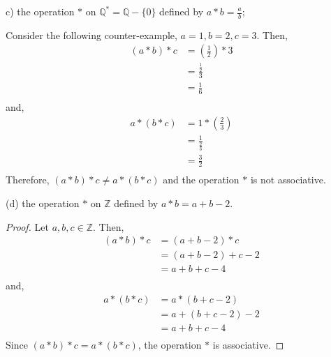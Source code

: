 \documentclass[12pt]{article}
\newenvironment{problem}[2][Problem]{\begin{trivlist}
\item[\hskip \labelsep {\bfseries #1}\hskip \labelsep {\bfseries #2.}]}{\end{trivlist}}
\begin{document}
\begin{problem}{1}
(c) the operation $*$ on $\mathbb{Q}^{*}=\mathbb{Q}-\{0\}$ defined by $a * b=\frac{a}{b}$;

	Consider the following counter-example, $a=1, b=2, c=3$. Then,
	$$
	\begin{aligned}
		(a * b) * c &= (\frac{1}{2}) * 3 \\
			    &= \frac{\frac{1}{2}}{3} \\
			    &= \frac{1}{6} \\
	\end{aligned}
	$$
	and, 
	$$
	\begin{aligned}
		a * (b * c) &= 1 * (\frac{2}{3}) \\
			    &= \frac{1}{\frac{2}{3}} \\
			    &= \frac{3}{2} \\
	\end{aligned}
	$$
	Therefore, $(a * b) * c \neq a * (b * c)$ and the operation $*$ is not associative.
\break

(d) the operation $*$ on $\mathbb{Z}$ defined by $a * b=a+b-2$.
\begin{proof}
	Let $a,b,c \in \mathbb{Z}$. Then,
	$$
	\begin{aligned}
	(a * b) * c &= (a+b-2) * c \\
		    &= (a+b-2)+c-2 \\
		    &= a+b+c-4 \\
	\end{aligned}
	$$
	and,
	$$
	\begin{aligned}
	a * (b * c) &= a * (b+c-2) \\
		    &= a+(b+c-2)-2 \\
		    &= a+b+c-4 \\
	\end{aligned}
	$$
	Since $(a * b) * c = a * (b * c)$, the operation $*$ is associative.
\end{proof}


\end{problem}
\end{document}
